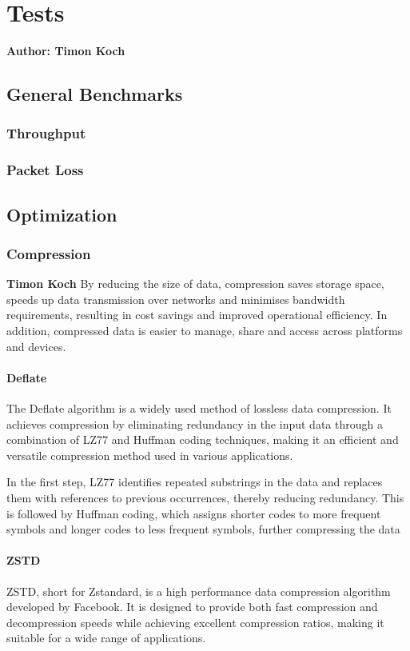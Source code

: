 \chapter{Tests}

\textbf{Author: Timon Koch}

\section{General Benchmarks}
\subsection{Throughput}
\subsection{Packet Loss}

\section{Optimization}
\subsection{Compression}
\textbf{Timon Koch}
By reducing the size of data, compression saves storage space, speeds up data transmission over networks and minimises bandwidth requirements, resulting in cost savings and improved operational efficiency. In addition, compressed data is easier to manage, share and access across platforms and devices. 

\subsubsection{Deflate}
The Deflate algorithm is a widely used method of lossless data compression. It achieves compression by eliminating redundancy in the input data through a combination of LZ77 and Huffman coding techniques, making it an efficient and versatile compression method used in various applications.

In the first step, LZ77 identifies repeated substrings in the data and replaces them with references to previous occurrences, thereby reducing redundancy. This is followed by Huffman coding, which assigns shorter codes to more frequent symbols and longer codes to less frequent symbols, further compressing the data

\subsubsection{ZSTD}
ZSTD, short for Zstandard, is a high performance data compression algorithm developed by Facebook. It is designed to provide both fast compression and decompression speeds while achieving excellent compression ratios, making it suitable for a wide range of applications.


